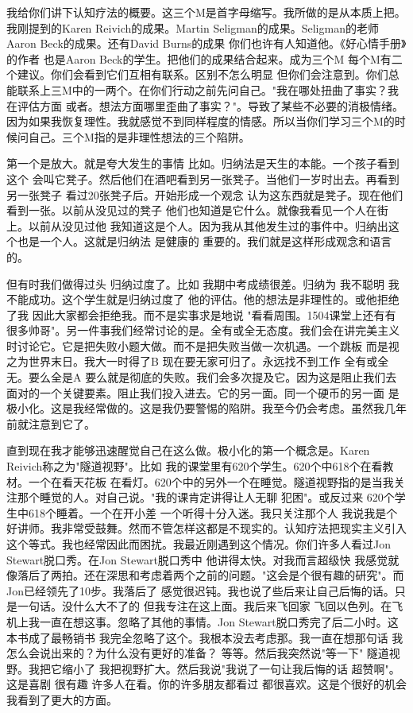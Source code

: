 我给你们讲下认知疗法的概要。这三个M是首字母缩写。我所做的是从本质上把。我刚提到的Karen Reivich的成果。Martin Seligman的成果。Seligman的老师Aaron Beck的成果。还有David Burns的成果 你们也许有人知道他。《好心情手册》的作者 也是Aaron Beck的学生。把他们的成果结合起来。成为三个M 每个M有二个建议。你们会看到它们互相有联系。区别不怎么明显 但你们会注意到。你们总能联系上三M中的一两个。在你们行动之前先问自己。"我在哪处扭曲了事实？我在评估方面 或者。想法方面哪里歪曲了事实？"。导致了某些不必要的消极情绪。因为如果我恢复理性。我就感觉不到同样程度的情感。所以当你们学习三个M的时候问自己。三个M指的是非理性想法的三个陷阱。 

第一个是放大。就是夸大发生的事情 比如。归纳法是天生的本能。一个孩子看到这个 会叫它凳子。然后他们在酒吧看到另一张凳子。当他们一岁时出去。再看到另一张凳子 看过20张凳子后。开始形成一个观念 认为这东西就是凳子。现在他们看到一张。以前从没见过的凳子 他们也知道是它什么。就像我看见一个人在街上。以前从没见过他 我知道这是个人。因为我从其他发生过的事件中。归纳出这个也是一个人。这就是归纳法 是健康的 重要的。我们就是这样形成观念和语言的。 

但有时我们做得过头 归纳过度了。比如 我期中考成绩很差。归纳为 我不聪明 我不能成功。这个学生就是归纳过度了 他的评估。他的想法是非理性的。或他拒绝了我 因此大家都会拒绝我。而不是实事求是地说 "看看周围。1504课堂上还有有很多帅哥"。另一件事我们经常讨论的是。全有或全无态度。我们会在讲完美主义时讨论它。它是把失败小题大做。而不是把失败当做一次机遇。一个跳板 而是视之为世界末日。我大一时得了B 现在要无家可归了。永远找不到工作 全有或全无。要么全是A 要么就是彻底的失败。我们会多次提及它。因为这是阻止我们去面对的一个关键要素。阻止我们投入进去。它的另一面。同一个硬币的另一面 是极小化。这是我经常做的。这是我仍要警惕的陷阱。我至今仍会考虑。虽然我几年前就注意到它了。 

直到现在我才能够迅速醒觉自己在这么做。极小化的第一个概念是。Karen Reivich称之为"隧道视野"。比如 我的课堂里有620个学生。620个中618个在看教材。一个在看天花板 在看灯。620个中的另外一个在睡觉。隧道视野指的是当我关注那个睡觉的人。对自己说。"我的课肯定讲得让人无聊 犯困"。或反过来 620个学生中618个睡着。一个在开小差 一个听得十分入迷。我只关注那个人 我说我是个好讲师。我非常受鼓舞。然而不管怎样这都是不现实的。认知疗法把现实主义引入这个等式。我也经常因此而困扰。我最近刚遇到这个情况。你们许多人看过Jon Stewart脱口秀。在Jon Stewart脱口秀中 他讲得太快。对我而言超级快 我感觉就像落后了两拍。还在深思和考虑着两个之前的问题。"这会是个很有趣的研究"。而Jon已经领先了10步。我落后了 感觉很迟钝。我也说了些后来让自己后悔的话。只是一句话。没什么大不了的 但我专注在这上面。我后来飞回家 飞回以色列。在飞机上我一直在想这事。忽略了其他的事情。Jon Stewart脱口秀完了后二小时。这本书成了最畅销书 我完全忽略了这个。我根本没去考虑那。我一直在想那句话 我怎么会说出来的？为什么没有更好的准备？ 等等。然后我突然说"等一下" 隧道视野。我把它缩小了 我把视野扩大。然后我说"我说了一句让我后悔的话 超赞啊"。这是喜剧 很有趣 许多人在看。你的许多朋友都看过 都很喜欢。这是个很好的机会 我看到了更大的方面。 

